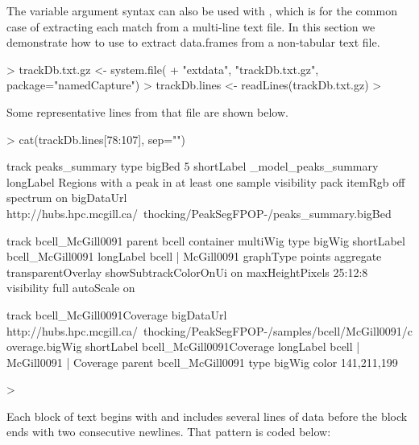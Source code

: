 The variable argument syntax can also be used with
, which is for the common case of extracting
each match from a multi-line text file. In this section we demonstrate
how to use  to extract data.frames from a
non-tabular text file.

\begin{Schunk}
\begin{Sinput}
> trackDb.txt.gz <- system.file(
+   "extdata", "trackDb.txt.gz", package="namedCapture")
> trackDb.lines <- readLines(trackDb.txt.gz)
> 
\end{Sinput}
\end{Schunk}

Some representative lines from that file are shown below.

\begin{Schunk}
\begin{Sinput}
> cat(trackDb.lines[78:107], sep="\n")
\end{Sinput}
\begin{Soutput}
track peaks_summary
type bigBed 5
shortLabel _model_peaks_summary
longLabel Regions with a peak in at least one sample
visibility pack
itemRgb off
spectrum on
bigDataUrl http://hubs.hpc.mcgill.ca/~thocking/PeakSegFPOP-/peaks_summary.bigBed


 track bcell_McGill0091
 parent bcell
 container multiWig
 type bigWig
 shortLabel bcell_McGill0091
 longLabel bcell | McGill0091
 graphType points
 aggregate transparentOverlay
 showSubtrackColorOnUi on
 maxHeightPixels 25:12:8
 visibility full
 autoScale on

  track bcell_McGill0091Coverage
  bigDataUrl http://hubs.hpc.mcgill.ca/~thocking/PeakSegFPOP-/samples/bcell/McGill0091/coverage.bigWig
  shortLabel bcell_McGill0091Coverage
  longLabel bcell | McGill0091 | Coverage
  parent bcell_McGill0091
  type bigWig
  color 141,211,199
\end{Soutput}
\begin{Sinput}
> 
\end{Sinput}
\end{Schunk}

Each block of text begins with  and includes several lines of
data before the block ends with two consecutive newlines. That pattern
is coded below:

